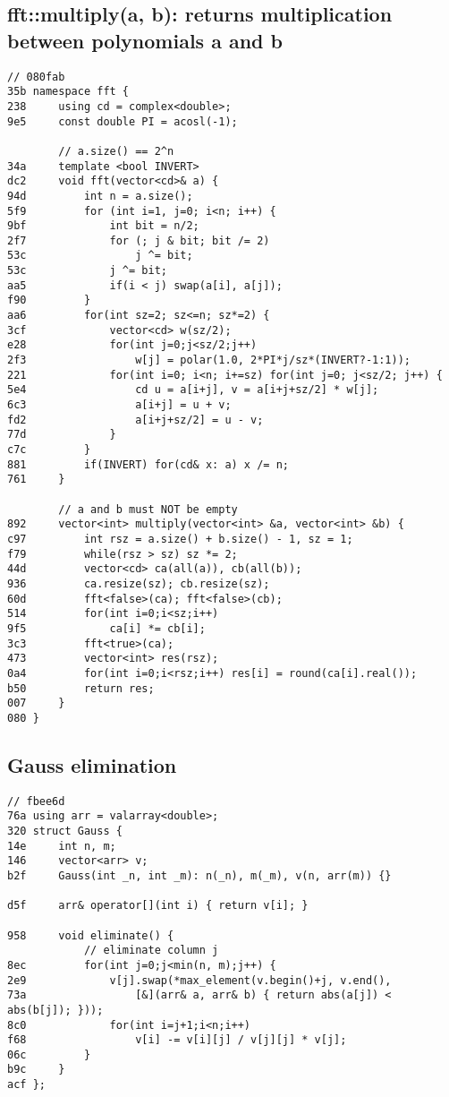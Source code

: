 \documentclass[11pt, a4paper, twoside]{article}
\begin{document}
\subsection{fft::multiply(a, b): returns multiplication between polynomials a and b}
\begin{lstlisting}
// 080fab
35b namespace fft {
238 	using cd = complex<double>;
9e5 	const double PI = acosl(-1);
    
    	// a.size() == 2^n
34a 	template <bool INVERT>
dc2 	void fft(vector<cd>& a) {
94d 		int n = a.size();
5f9 		for (int i=1, j=0; i<n; i++) {
9bf 			int bit = n/2;
2f7 			for (; j & bit; bit /= 2)
53c 				j ^= bit;
53c 			j ^= bit;
aa5 			if(i < j) swap(a[i], a[j]);
f90 		}
aa6 		for(int sz=2; sz<=n; sz*=2) {
3cf 			vector<cd> w(sz/2);
e28 			for(int j=0;j<sz/2;j++) 
2f3 				w[j] = polar(1.0, 2*PI*j/sz*(INVERT?-1:1));
221 			for(int i=0; i<n; i+=sz) for(int j=0; j<sz/2; j++) {
5e4 				cd u = a[i+j], v = a[i+j+sz/2] * w[j];
6c3 				a[i+j] = u + v;
fd2 				a[i+j+sz/2] = u - v;
77d 			}
c7c 		}
881 		if(INVERT) for(cd& x: a) x /= n;
761 	}
    
    	// a and b must NOT be empty
892 	vector<int> multiply(vector<int> &a, vector<int> &b) {
c97 		int rsz = a.size() + b.size() - 1, sz = 1;
f79 		while(rsz > sz) sz *= 2;
44d 		vector<cd> ca(all(a)), cb(all(b));
936 		ca.resize(sz); cb.resize(sz);
60d 		fft<false>(ca); fft<false>(cb);
514 		for(int i=0;i<sz;i++)
9f5 			ca[i] *= cb[i];
3c3 		fft<true>(ca);
473 		vector<int> res(rsz);
0a4 		for(int i=0;i<rsz;i++) res[i] = round(ca[i].real());
b50 		return res;
007 	}
080 }
\end{lstlisting}

\subsection{Gauss elimination}
\begin{lstlisting}
// fbee6d
76a using arr = valarray<double>;
320 struct Gauss {
14e 	int n, m;
146 	vector<arr> v;
b2f 	Gauss(int _n, int _m): n(_n), m(_m), v(n, arr(m)) {}
    
d5f 	arr& operator[](int i) { return v[i]; }
    
958 	void eliminate() {
    		// eliminate column j
8ec 		for(int j=0;j<min(n, m);j++) {
2e9 			v[j].swap(*max_element(v.begin()+j, v.end(), 
73a 				[&](arr& a, arr& b) { return abs(a[j]) < abs(b[j]); }));
8c0 			for(int i=j+1;i<n;i++)
f68 				v[i] -= v[i][j] / v[j][j] * v[j];
06c 		}
b9c 	}
acf };
\end{lstlisting}
\end{document}
